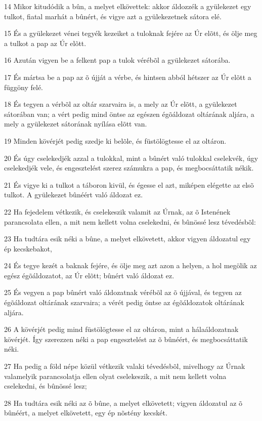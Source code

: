 \par 14 Mikor kitudódik a bûn, a melyet elkövettek: akkor áldozzék a gyülekezet egy tulkot, fiatal marhát a bûnért, és vigye azt a gyülekezetnek sátora elé.
\par 15 És a gyülekezet vénei tegyék kezeiket a tuloknak fejére az Úr elõtt, és ölje meg a tulkot a pap az Úr elõtt.
\par 16 Azután vigyen be a felkent pap a tulok vérébõl a gyülekezet sátorába.
\par 17 És mártsa be a pap az õ újját a vérbe, és hintsen abból hétszer az Úr elõtt a függöny felé.
\par 18 És tegyen a vérbõl az oltár szarvaira is, a mely az Úr elõtt, a gyülekezet sátorában van; a vért pedig mind öntse az egészen égõáldozat oltárának aljára, a mely a gyülekezet sátorának nyílása elõtt van.
\par 19 Minden kövérjét pedig szedje ki belõle, és füstölögtesse el az oltáron.
\par 20 És úgy cselekedjék azzal a tulokkal, mint a bûnért való tulokkal cselekvék, úgy cselekedjék vele, és engesztelést szerez számukra a pap, és megbocsáttatik nékik.
\par 21 És vigye ki a tulkot a táboron kivül, és égesse el azt, miképen elégette az elsõ tulkot. A gyülekezet bûnéért való áldozat ez.
\par 22 Ha fejedelem vétkezik, és cselekeszik valamit az Úrnak, az õ Istenének parancsolata ellen, a mit nem kellett volna cselekedni, és bûnössé lesz tévedésbõl:
\par 23 Ha tudtára esik néki a bûne, a melyet elkövetett, akkor vigyen áldozatul egy ép kecskebakot,
\par 24 És tegye kezét a baknak fejére, és ölje meg azt azon a helyen, a hol megölik az egész égõáldozatot, az Úr elõtt; bûnért való áldozat ez.
\par 25 És vegyen a pap bûnért való áldozatnak vérébõl az õ újjával, és tegyen az égõáldozat oltárának szarvaira; a vérét pedig öntse az égõáldozatok oltárának aljára.
\par 26 A kövérjét pedig mind füstölögtesse el az oltáron, mint a hálaáldozatnak kövérjét. Így szerezzen néki a pap engesztelést az õ bûnéért, és megbocsáttatik néki.
\par 27 Ha pedig a föld népe közül vétkezik valaki tévedésbõl, mivelhogy az Úrnak valamelyik parancsolatja ellen olyat cselekeszik, a mit nem kellett volna cselekedni, és bûnössé lesz;
\par 28 Ha tudtára esik néki az õ bûne, a melyet elkövetett; vigyen áldozatul az õ bûnéért, a melyet elkövetett, egy ép nõstény kecskét.
